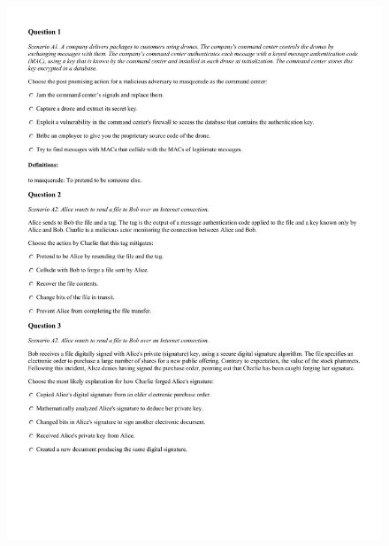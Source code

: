 \begin{figure}[!h]
    \begin{center}
    \advance\leftskip-3cm
    \advance\rightskip-3cm
    \includegraphics[scale=.25]{images/exam/correctly_formated_exam-02.jpg}
    \label{fig:correctly_formated_exam-02}
\end{center}
\end{figure}

